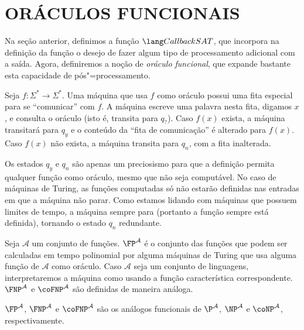 \section{ORÁCULOS FUNCIONAIS}
\label{sec:functional_oracles}

Na seção anterior,
definimos a função $\CallbackSAT$,
que incorpora na definição da função
o desejo de fazer algum tipo de processamento adicional com a saída.
Agora,
definiremos a noção de \emph{oráculo funcional},
que expande bastante esta capacidade de pós"=processamento.

\begin{definition}
    Seja $f : \Sigma^* \rightarrow \Sigma^*$.
    Uma máquina que usa $f$ como oráculo
    possui uma fita especial para se ``comunicar'' com $f$.
    A máquina escreve uma palavra nesta fita,
    digamos $x$,
    e consulta o oráculo
    (isto é, transita para $q_?$).
    Caso $f(x)$ exista,
    a máquina transitará para $q_y$
    e o conteúdo da ``fita de comunicação'' é alterado para $f(x)$.
    Caso $f(x)$ não exista,
    a máquina transita para $q_n$,
    com a fita inalterada.
\end{definition}

Os estados $q_y$ e $q_n$ são apenas um preciosismo
para que a definição permita qualquer função como oráculo,
mesmo que não seja computável.
No caso de máquinas de Turing,
as funções computadas só não estarão definidas
nas entradas em que a máquina não parar.
Como estamos lidando com máquinas que possuem limites de tempo,
a máquina sempre para
(portanto a função sempre está definida),
tornando o estado $q_n$ redundante.

\begin{definition}
    Seja $\mathcal A$ um conjunto de funções.
    $\FP^\mathcal A$ é o conjunto das funções
    que podem ser calculadas em tempo polinomial
    por alguma máquinas de Turing que usa alguma função de $\mathcal A$ como oráculo.
    Caso $\mathcal A$ seja um conjunto de linguagens,
    interpretaremos a máquina como usando a função característica correspondente.
    $\FNP^\mathcal A$ e $\coFNP^\mathcal A$
    são definidas de maneira análoga.
\end{definition}

$\FP^\mathcal A$, $\FNP^\mathcal A$ e $\coFNP^\mathcal A$
são os análogos funcionais de
$\P^\mathcal A$, $\NP^\mathcal A$ e $\coNP^\mathcal A$,
respectivamente.

